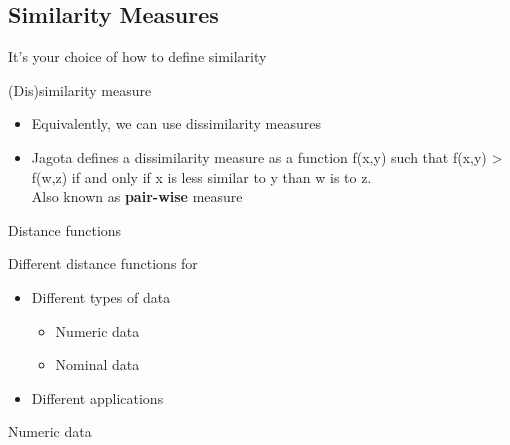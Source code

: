 \documentclass[
]{book}
\providecommand{\tightlist}{%
  \setlength{\itemsep}{0pt}\setlength{\parskip}{0pt}}
\begin{document}
\hypertarget{similarity-measures}{%
\subsection{Similarity Measures}\label{similarity-measures}}

It's your choice of how to define similarity

(Dis)similarity measure

\begin{itemize}
\tightlist
\item
  Equivalently, we can use dissimilarity measures\\
\item
  Jagota defines a dissimilarity measure as a function f(x,y) such that f(x,y) \textgreater{} f(w,z) if and only if x is less similar to y than w is to z.\\
  Also known as \textbf{pair-wise} measure
\end{itemize}

Distance functions

Different distance functions for

\begin{itemize}
\item
  Different types of data

  \begin{itemize}
  \tightlist
  \item
    Numeric data\\
  \item
    Nominal data\\
  \end{itemize}
\item
  Different applications
\end{itemize}

Numeric data
\end{document}
